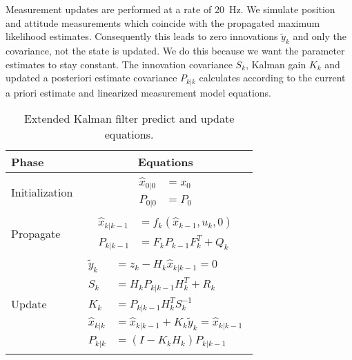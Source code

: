 \documentclass[10pt,a4paper]{article}
\begin{document}
Measurement updates are performed at a rate of \SI{20}{\hertz}. We simulate position and attitude measurements which coincide with the propagated maximum likelihood estimates. Consequently this leads to zero innovations $\tilde{y}_k$ and only the covariance, not the state is updated. We do this because we want the parameter estimates to stay constant. The innovation covariance $S_k$, Kalman gain $K_k$ and updated a posteriori estimate covariance $P_{k|k}$ calculates according to the current a priori estimate and linearized measurement model equations.  

\begin{table}
\centering
\begin{tabular}{lc}
Phase & Equations \\
\hline   
Initialization & \parbox{7cm}{\begin{subequations} \label{eq:EKF:initialize} \begin{align} 
\hat{x}_{0|0} &= x_0 \\
P_{0|0} &= P_0
\end{align} \end{subequations}} \\
Propagate & \parbox{7cm}{\begin{subequations} \label{eq:EKF:propagate} \begin{align}
\hat{x}_{k|k-1} &= f_k(\hat{x}_{k-1}, u_k, 0) \label{eq:EKF:propagate:state}\\
P_{k|k-1} &= F_k P_{k-1} F^T_k + Q_k \label{eq:EKF:propagate:covariance}
\end{align}\end{subequations}}  \\
Update & \parbox{7cm}{\begin{subequations} \label{eq:EKF:update} \begin{align}
\tilde{y}_k &= z_k - H_k \hat{x}_{k|k-1} = 0 \\
S_k &= H_k P_{k|k-1} H^T_k + R_k \label{eq:EKF:update:innovation_covariance}\\
K_k &= P_{k|k-1} H^T_k S_k^{-1} \label{eq:EKF:update:kalman_gain}\\
\hat{x}_{k|k} &= \hat{x}_{k|k-1} + K_k \tilde{y}_k = \hat{x}_{k|k-1} \label{eq:EKF:update:posteriori_estimate}\\
P_{k|k} &= (I - K_k H_k) P_{k|k-1}\label{eq:EKF:update:posteriori_cov_estimate}
\end{align}\end{subequations}}
\end{tabular}
\caption{Extended Kalman filter predict and update equations. \label{tab:EKF}}
\end{table}
\end{document}
